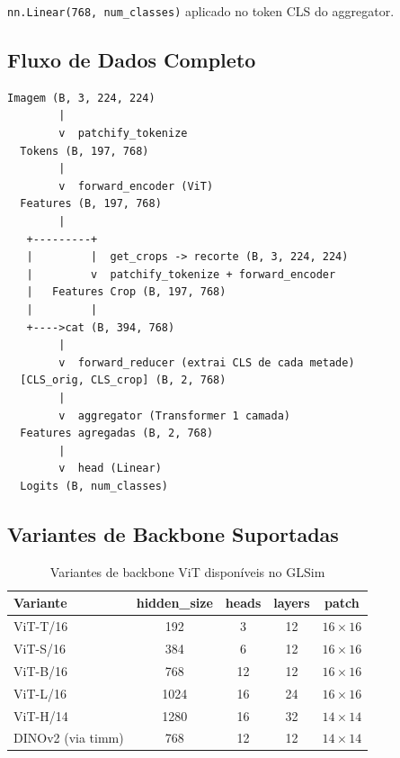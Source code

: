 \documentclass[a4paper,12pt]{scrartcl}
\begin{document}
\texttt{nn.Linear(768, num\_classes)} aplicado no token CLS do aggregator.

\subsection{Fluxo de Dados Completo}

\begin{lstlisting}[style=treestyle,
  caption={Pipeline completo de dados do GLSim}]
Imagem (B, 3, 224, 224)
        |
        v  patchify_tokenize
  Tokens (B, 197, 768)
        |
        v  forward_encoder (ViT)
  Features (B, 197, 768)
        |
   +---------+
   |         |  get_crops -> recorte (B, 3, 224, 224)
   |         v  patchify_tokenize + forward_encoder
   |   Features Crop (B, 197, 768)
   |         |
   +---->cat (B, 394, 768)
        |
        v  forward_reducer (extrai CLS de cada metade)
  [CLS_orig, CLS_crop] (B, 2, 768)
        |
        v  aggregator (Transformer 1 camada)
  Features agregadas (B, 2, 768)
        |
        v  head (Linear)
  Logits (B, num_classes)
\end{lstlisting}

\subsection{Variantes de Backbone Suportadas}

\begin{table}[h!]
  \centering
  \caption{Variantes de backbone ViT dispon\'iveis no GLSim}
  \begin{tabular}{lcccc}
    \toprule
    \textbf{Variante} & \textbf{hidden\_size} & \textbf{heads} &
    \textbf{layers} & \textbf{patch} \\
    \midrule
    ViT-T/16             & 192  & 3  & 12 & $16{\times}16$ \\
    ViT-S/16             & 384  & 6  & 12 & $16{\times}16$ \\
    ViT-B/16             & 768  & 12 & 12 & $16{\times}16$ \\
    ViT-L/16             & 1024 & 16 & 24 & $16{\times}16$ \\
    ViT-H/14             & 1280 & 16 & 32 & $14{\times}14$ \\
    DINOv2 (via timm)    & 768  & 12 & 12 & $14{\times}14$ \\
    \bottomrule
  \end{tabular}
  \label{tab:backbones}
\end{table}
\end{document}
